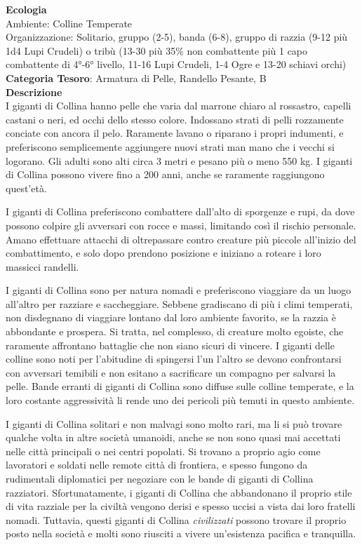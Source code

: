 \begin{multicols}{2}
{\textbf{Ecologia}\\
Ambiente: Colline Temperate\\
Organizzazione: Solitario, gruppo (2-5), banda (6-8), gruppo di razzia (9-12 più 1d4 Lupi Crudeli) o tribù (13-30 più 35\% non combattente più 1 capo combattente di 4°-6° livello, 11-16 Lupi Crudeli, 1-4 Ogre e 13-20 schiavi orchi)\\
\textbf{Categoria Tesoro}: Armatura di Pelle, Randello Pesante, B\\
\textbf{Descrizione}\\
I giganti di Collina hanno pelle che varia dal marrone chiaro al rossastro, capelli castani o neri, ed occhi dello stesso colore. Indossano strati di pelli rozzamente conciate con ancora il pelo. Raramente lavano o riparano i propri indumenti, e preferiscono semplicemente aggiungere nuovi strati man mano che i vecchi si logorano. Gli adulti sono alti circa 3 metri e pesano più o meno 550 kg. I giganti di Collina possono vivere fino a 200 anni, anche se raramente raggiungono quest'età.

I giganti di Collina preferiscono combattere dall'alto di sporgenze e rupi, da dove possono colpire gli avversari con rocce e massi, limitando così il rischio personale. Amano effettuare attacchi di oltrepassare contro creature più piccole all'inizio del combattimento, e solo dopo prendono posizione e iniziano a roteare i loro massicci randelli.

I giganti di Collina sono per natura nomadi e preferiscono viaggiare da un luogo all'altro per razziare e saccheggiare. Sebbene gradiscano di più i climi temperati, non disdegnano di viaggiare lontano dal loro ambiente favorito, se la razzia è abbondante e prospera. Si tratta, nel complesso, di creature molto egoiste, che raramente affrontano battaglie che non siano sicuri di vincere. I giganti delle colline sono noti per l'abitudine di spingersi l'un l'altro se devono confrontarsi con avversari temibili e non esitano a sacrificare un compagno per salvarsi la pelle. Bande erranti di giganti di Collina sono diffuse sulle colline temperate, e la loro costante aggressività li rende uno dei pericoli più temuti in questo ambiente.

I giganti di Collina solitari e non malvagi sono molto rari, ma li si può trovare qualche volta in altre società umanoidi, anche se non sono quasi mai accettati nelle città principali o nei centri popolati. Si trovano a proprio agio come lavoratori e soldati nelle remote città di frontiera, e spesso fungono da rudimentali diplomatici per negoziare con le bande di giganti di Collina razziatori. Sfortunatamente, i giganti di Collina che abbandonano il proprio stile di vita razziale per la civiltà vengono derisi e spesso uccisi a vista dai loro fratelli nomadi. Tuttavia, questi giganti di Collina \emph{civilizzati} possono trovare il proprio posto nella società e molti sono riusciti a vivere un'esistenza pacifica e tranquilla.

}
\end{multicols}
